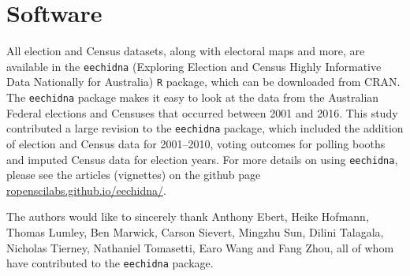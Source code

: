 \documentclass[11pt,a4paper,]{article}
\begin{document}
\hypertarget{software}{%
\section{Software}\label{software}}

All election and Census datasets, along with electoral maps and more, are available in the \texttt{eechidna} (Exploring Election and Census Highly Informative Data Nationally for Australia) \texttt{R} package, which can be downloaded from CRAN. The \texttt{eechidna} package makes it easy to look at the data from the Australian Federal elections and Censuses that occurred between 2001 and 2016. This study contributed a large revision to the \texttt{eechidna} package, which included the addition of election and Census data for 2001--2010, voting outcomes for polling booths and imputed Census data for election years. For more details on using \texttt{eechidna}, please see the articles (vignettes) on the github page \href{https://ropenscilabs.github.io/eechidna/}{ropenscilabs.github.io/eechidna/}.

The authors would like to sincerely thank Anthony Ebert, Heike Hofmann, Thomas Lumley, Ben Marwick, Carson Sievert, Mingzhu Sun, Dilini Talagala, Nicholas Tierney, Nathaniel Tomasetti, Earo Wang and Fang Zhou, all of whom have contributed to the \texttt{eechidna} package.

\printbibliography
\end{document}
